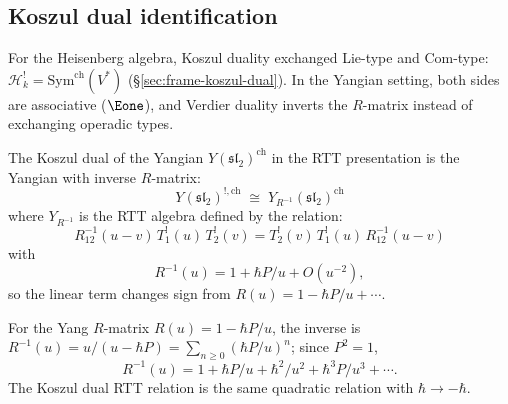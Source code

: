 \subsection{Koszul dual identification}

For the Heisenberg algebra, Koszul duality exchanged Lie-type and Com-type: $\mathcal{H}_k^! = \mathrm{Sym}^{\mathrm{ch}}(V^*)$ (\S\ref{sec:frame-koszul-dual}).  In the Yangian setting, both sides are associative ($\Eone$), and Verdier duality inverts the $R$-matrix instead of exchanging operadic types.

\begin{theorem}\label{thm:yangian-koszul-dual}
The Koszul dual of the Yangian $Y(\mathfrak{sl}_2)^{\mathrm{ch}}$ in the RTT presentation is the Yangian with inverse $R$-matrix:
\begin{equation}\label{eq:yangian-koszul-dual}
Y(\mathfrak{sl}_2)^{!,\mathrm{ch}} \;\cong\; Y_{R^{-1}}(\mathfrak{sl}_2)^{\mathrm{ch}}
\end{equation}
where $Y_{R^{-1}}$ is the RTT algebra defined by the relation:
\[
R^{-1}_{12}(u-v)\, T_1^!(u)\, T_2^!(v) = T_2^!(v)\, T_1^!(u)\, R^{-1}_{12}(u-v)
\]
with
\[
R^{-1}(u) = 1 + \hbar P/u + O(u^{-2}),
\]
so the linear term changes sign from $R(u) = 1 - \hbar P/u + \cdots$.

For the Yang $R$-matrix $R(u) = 1 - \hbar P/u$, the inverse is
$R^{-1}(u) = u/(u - \hbar P) = \sum_{n \geq 0} (\hbar P/u)^n$;
since $P^2 = 1$,
\[
R^{-1}(u) = 1 + \hbar P/u + \hbar^2/u^2 + \hbar^3 P/u^3 + \cdots.
\]
The Koszul dual RTT relation is the same quadratic
relation with $\hbar \to -\hbar$.
\end{theorem}

